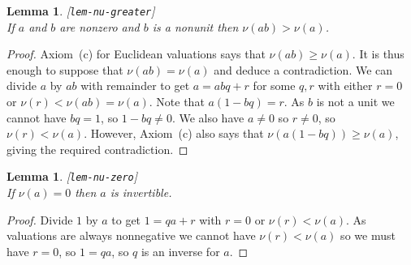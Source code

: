 \documentclass{amsart}
\newcommand{\lbl}[1]{\label{#1}\textup{[\texttt{#1}]}\ \\}
\newcommand{\lbl}{\label}
\renewcommand{\:}{\colon}
\newtheorem{lemma}[theorem]{Lemma}
\theoremstyle{definition}
\begin{document}
\begin{lemma}\lbl{lem-nu-greater}
 If $a$ and $b$ are nonzero and $b$ is a nonunit then
 $\nu(ab)>\nu(a)$. 
\end{lemma}
\begin{proof}
 Axiom~(c) for Euclidean valuations says that $\nu(ab)\geq\nu(a)$.  It
 is thus enough to suppose that $\nu(ab)=\nu(a)$ and deduce a
 contradiction.  We can divide $a$ by $ab$ with remainder to get
 $a=abq+r$ for some $q,r$ with either $r=0$ or
 $\nu(r)<\nu(ab)=\nu(a)$.  Note that $a(1-bq)=r$.  As $b$ is not a
 unit we cannot have $bq=1$, so $1-bq\neq 0$.  We also have $a\neq 0$
 so $r\neq 0$, so $\nu(r)<\nu(a)$.  However, Axiom~(c) also says that
 $\nu(a(1-bq))\geq\nu(a)$, giving the required contradiction.
\end{proof}

\begin{lemma}\lbl{lem-nu-zero}
 If $\nu(a)=0$ then $a$ is invertible.
\end{lemma}
\begin{proof}
 Divide $1$ by $a$ to get $1=qa+r$ with $r=0$ or $\nu(r)<\nu(a)$.  As
 valuations are always nonnegative we cannot have $\nu(r)<\nu(a)$ so
 we must have $r=0$, so $1=qa$, so $q$ is an inverse for $a$.
\end{proof}
\end{document}
